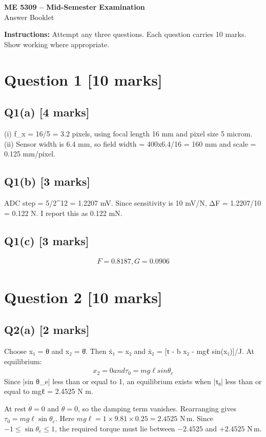 \documentclass[11pt,a4paper]{article}
\begin{document}
\begin{center}
{\Large\bfseries ME 5309 -- Mid-Semester Examination}\\[3pt]
{\large Answer Booklet}\\[8pt]
\end{center}
\textbf{Instructions:} Attempt any three questions. Each question carries 10 marks. Show working where appropriate.
\section*{Question 1 \hfill [10 marks]}
\subsection*{Q1(a) \hfill [4 marks]}

(i) f\_x = 16/5 = 3.2 pixels, using focal length 16 mm and pixel size 5 microm.
(ii) Sensor width is 6.4 mm, so field width = 400x6.4/16 = 160 mm and scale = 0.125 mm/pixel.

\subsection*{Q1(b) \hfill [3 marks]}

ADC step = 5/2\textasciicircum{}12 = 1.2207 mV.
Since sensitivity is 10 mV/N, ΔF = 1.2207/10 = 0.122 N.
I report this as 0.122 mN.

\subsection*{Q1(c) \hfill [3 marks]}

\[\begin{aligned}F = 0.8187, G = 0.0906\end{aligned}\]

\section*{Question 2 \hfill [10 marks]}
\subsection*{Q2(a) \hfill [2 marks]}

Choose x₁ = θ and x₂ = θ̇.
Then ẋ₁ = x₂ and ẋ₂ = [τ - b x₂ - mgℓ sin(x₁)]/J.
At equilibrium:\[\begin{aligned}x_2 = 0 and τ_0 = mg\ell sin \theta_e\end{aligned}\]
Since |sin θ\_e| less than or equal to 1, an equilibrium exists when |τ₀| less than or equal to mgℓ = 2.4525 N m.\par\smallskip At rest $\dot\theta=0$ and $\ddot\theta=0$, so the damping term vanishes. Rearranging gives $\tau_0=mg\ell\sin\theta_e$. Here $mg\ell=1\times9.81\times0.25=2.4525$ N\,m. Since $-1\leq\sin\theta_e\leq1$, the required torque must lie between $-2.4525$ and $+2.4525$ N\,m.
\end{document}
